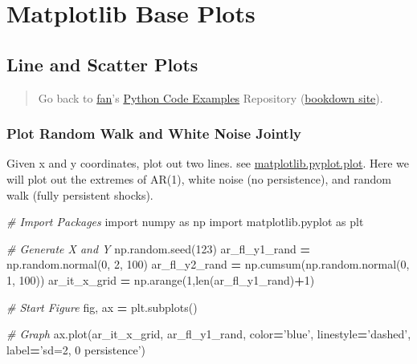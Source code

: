 \documentclass[
]{book}
\newenvironment{Shaded}{\begin{snugshade}}{\end{snugshade}}
\newcommand{\BuiltInTok}[1]{#1}
\newcommand{\CommentTok}[1]{\textcolor[rgb]{0.56,0.35,0.01}{\textit{#1}}}
\newcommand{\DecValTok}[1]{\textcolor[rgb]{0.00,0.00,0.81}{#1}}
\newcommand{\ImportTok}[1]{#1}
\newcommand{\NormalTok}[1]{#1}
\newcommand{\OperatorTok}[1]{\textcolor[rgb]{0.81,0.36,0.00}{\textbf{#1}}}
\newcommand{\StringTok}[1]{\textcolor[rgb]{0.31,0.60,0.02}{#1}}
\begin{document}
\hypertarget{matplotlib-base-plots}{%
\section{Matplotlib Base Plots}\label{matplotlib-base-plots}}

\hypertarget{line-and-scatter-plots}{%
\subsection{Line and Scatter Plots}\label{line-and-scatter-plots}}

\begin{quote}
Go back to \href{http://fanwangecon.github.io/}{fan}'s \href{https://fanwangecon.github.io/pyfan/}{Python Code Examples} Repository (\href{https://fanwangecon.github.io/pyfan/bookdown}{bookdown site}).
\end{quote}

\hypertarget{plot-random-walk-and-white-noise-jointly}{%
\subsubsection{Plot Random Walk and White Noise Jointly}\label{plot-random-walk-and-white-noise-jointly}}

Given x and y coordinates, plot out two lines. see \href{https://matplotlib.org/2.1.1/api/_as_gen/matplotlib.pyplot.plot.html}{matplotlib.pyplot.plot}. Here we will plot out the extremes of AR(1), white noise (no persistence), and random walk (fully persistent shocks).

\begin{Shaded}
\begin{Highlighting}[]
\CommentTok{# Import Packages}
\ImportTok{import}\NormalTok{ numpy }\ImportTok{as}\NormalTok{ np}
\ImportTok{import}\NormalTok{ matplotlib.pyplot }\ImportTok{as}\NormalTok{ plt}

\CommentTok{# Generate X and Y}
\NormalTok{np.random.seed(}\DecValTok{123}\NormalTok{)}
\NormalTok{ar_fl_y1_rand }\OperatorTok{=}\NormalTok{ np.random.normal(}\DecValTok{0}\NormalTok{, }\DecValTok{2}\NormalTok{, }\DecValTok{100}\NormalTok{)}
\NormalTok{ar_fl_y2_rand }\OperatorTok{=}\NormalTok{ np.cumsum(np.random.normal(}\DecValTok{0}\NormalTok{, }\DecValTok{1}\NormalTok{, }\DecValTok{100}\NormalTok{))}
\NormalTok{ar_it_x_grid }\OperatorTok{=}\NormalTok{ np.arange(}\DecValTok{1}\NormalTok{,}\BuiltInTok{len}\NormalTok{(ar_fl_y1_rand)}\OperatorTok{+}\DecValTok{1}\NormalTok{)}

\CommentTok{# Start Figure}
\NormalTok{fig, ax }\OperatorTok{=}\NormalTok{ plt.subplots()}

\CommentTok{# Graph}
\NormalTok{ax.plot(ar_it_x_grid, ar_fl_y1_rand,}
\NormalTok{                     color}\OperatorTok{=}\StringTok{'blue'}\NormalTok{, linestyle}\OperatorTok{=}\StringTok{'dashed'}\NormalTok{,}
\NormalTok{                     label}\OperatorTok{=}\StringTok{'sd=2, 0 persistence'}\NormalTok{)}
\end{Highlighting}
\end{Shaded}
\end{document}
